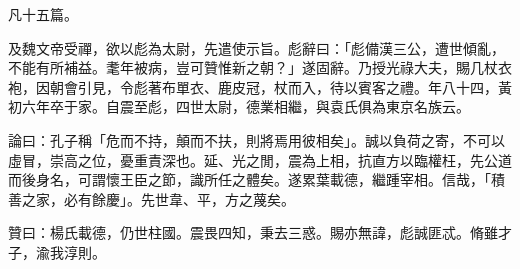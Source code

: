 \begin{pinyinscope}
凡十五篇。

及魏文帝受禪，欲以彪為太尉，先遣使示旨。彪辭曰：「彪備漢三公，遭世傾亂，不能有所補益。耄年被病，豈可贊惟新之朝？」遂固辭。乃授光祿大夫，賜几杖衣袍，因朝會引見，令彪著布單衣、鹿皮冠，杖而入，待以賓客之禮。年八十四，黃初六年卒于家。自震至彪，四世太尉，德業相繼，與袁氏俱為東京名族云。

論曰：孔子稱「危而不持，顛而不扶，則將焉用彼相矣」。誠以負荷之寄，不可以虛冒，崇高之位，憂重責深也。延、光之閒，震為上相，抗直方以臨權枉，先公道而後身名，可謂懷王臣之節，識所任之體矣。遂累葉載德，繼踵宰相。信哉，「積善之家，必有餘慶」。先世韋、平，方之蔑矣。

贊曰：楊氏載德，仍世柱國。震畏四知，秉去三惑。賜亦無諱，彪誠匪忒。脩雖才子，渝我淳則。


\end{pinyinscope}